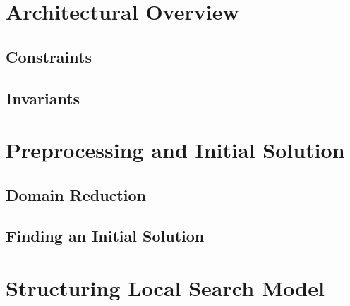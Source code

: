 \documentclass[a4paper,11pt]{article}
\begin{document}
    
 
%  
\newpage
\section{Architectural Overview}  
  
  \newpage
  \subsection{Constraints}
  
  \subsection{Invariants}
  
\section{Preprocessing and Initial Solution} \label{sec_gecode}
  
  \subsection{Domain Reduction}
  
  \subsection{Finding an Initial Solution}
  
  \newpage
\section{Structuring Local Search Model} \label{sec_ls}

\end{document}
